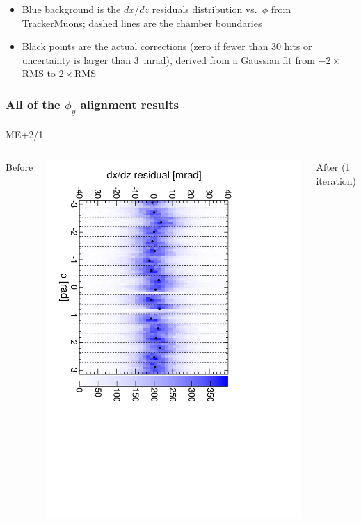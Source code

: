 \documentclass[compress]{beamer}
\begin{document}
\begin{frame}
\begin{itemize}
\item Blue background is the $dx/dz$ residuals distribution
  vs.\ $\phi$ from TrackerMuons; dashed lines are the chamber boundaries
\item Black points are the actual corrections (zero if fewer than 30
  hits or uncertainty is larger than 3~mrad), derived from a Gaussian
  fit from $-2\times$RMS to $2\times$RMS
\end{itemize}
\end{frame}

\begin{frame}
\frametitle{All of the $\phi_y$ alignment results}
\begin{center}
ME$+$2/1
\end{center}

\begin{columns}
\centering Before

\includegraphics[height=\linewidth, angle=90]{iter01_mep21.pdf}

\centering After (1 iteration)


\end{columns}
\end{frame}
\end{document}
